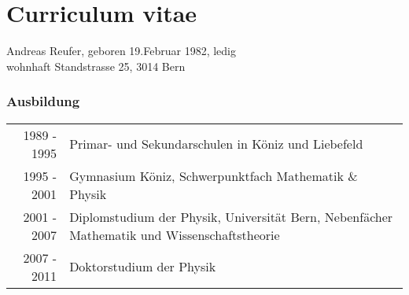

\chapter*{Curriculum vitae}

{ \large Andreas Reufer, geboren 19.Februar 1982, ledig} \\
{ \large wohnhaft Standstrasse 25, 3014 Bern} \\

\subsection*{Ausbildung}
\begin{tabular}{rp{12.0cm}}
1989 - 1995 & Primar- und Sekundarschulen in Köniz und Liebefeld\\
1995 - 2001 & Gymnasium Köniz, Schwerpunktfach Mathematik \& Physik \\
2001 - 2007 & Diplomstudium der Physik, Universität Bern, Nebenfächer Mathematik und Wissenschaftstheorie \\
2007 - 2011 & Doktorstudium der Physik \\
\end{tabular}


